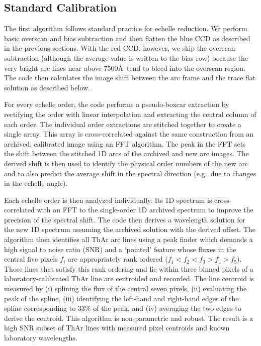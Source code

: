 \documentclass[12pt,preprint]{aastex}
\begin{document}
\subsection{Standard Calibration}

The first algorithm follows standard practice for echelle reduction.
We perform basic overscan and bias subtraction and then flatten the
blue CCD as described in the previous sections.  With the red CCD,
however, we skip the overscan subtraction (although the average value
is written to the bias row) because the very bright arc lines near
above 7500\AA\ tend to bleed into the overscan region.  The code then
calculates the image shift between the arc frame and the trace flat
solution as described below.

For every echelle order, the code performs a pseudo-boxcar
extraction by rectifying the order with linear interpolation
and extracting the central column of each order.  
The individual order extractions are stitched together to 
create a single array.  This array
is cross-correlated against the same construction from 
an archived, calibrated image using an FFT algorithm.
The peak in the FFT sets the shift between the stitched 1D
arcs of the archived and new arc images. 
The derived shift is then used to identify the physical order
numbers of the new arc 
and to also predict the average shift in the spectral direction
(e.g.\ due to changes in the echelle angle). 

Each echelle order is then analyzed individually.  Its 1D spectrum
is cross-correlated with an FFT to the single-order 1D archived
spectrum to improve the precision of the spectral shift.
The code then derives a wavelength solution for the new 1D spectrum
assuming the archived solution with the derived offset.
The algorithm then identifies all ThAr arc lines using a peak
finder which demands a high signal to noise ratio (SNR) 
and a `pointed' feature whose
fluxes in the central five pixels $f_i$ are appropriately rank ordered
($f_1 < f_2 < f_3 > f_4 > f_5$).
Those lines that satisfy this rank ordering
and lie within three binned pixels of a laboratory-calibrated
ThAr line are centroided and recorded.
The line centroid is measured by (i) splining the flux of the
central seven pixels, (ii) evaluating the peak of the spline,
(iii) identifying the left-hand and right-hand edges of 
the spline corresponding to 33\% of the peak, and (iv) averaging
the two edges to derive the centroid.
This algorithm is non-parametric and robust.
The result is a
high SNR subset of ThAr lines with measured pixel centroids
and known laboratory wavelengths.  
\end{document}
